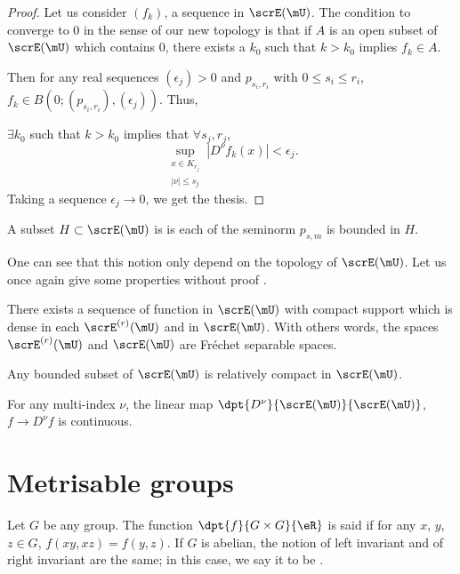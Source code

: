 \begin{proof}
Let us consider $(f_k)$, a sequence in $\scrE(\mU)$. The condition to converge to $0$ in the sense of our new topology is that if $A$ is an open subset of $\scrE(\mU)$ which contains $0$, there exists a $k_0$ such that $k>k_0$ implies $f_k\in A$.

Then for any real sequences $(\epsilon_j)>0$ and $p_{s_i,r_i}$ with $0\leq s_i\leq r_i$, $f_k\in B( 0;(p_{s_i,r_i}),(\epsilon_j) )$. Thus,

$\exists k_0$ such that $k>k_0$ implies that $\forall s_j,r_j$,
\[
   \sup_{ \substack{ x\in K_{r_j}\\|\nu|\leq s_j } }|D^{\nu}f_k(x)|<\epsilon_j.
\]
Taking a sequence $\epsilon_j\to 0$, we get the thesis.
\end{proof}


\begin{definition}
A subset $H\subset\scrE(\mU)$ is  is each of the seminorm $p_{s,m}$ is bounded in $H$.
\label{def:bounded}
\end{definition}
One can see that this notion only depend on the topology of $\scrE(\mU)$. Let us once again give some properties without proof .

\begin{proposition}
There exists a sequence of function in $\scrE(\mU)$ with compact support which is dense in each $\scrE^{(r)}(\mU)$ and in $\scrE(\mU)$. With others words, the spaces $\scrE^{(r)}(\mU)$ and $\scrE(\mU)$ are Fréchet separable spaces. 
\label{prop:E_Frechet}
\end{proposition}

\begin{proposition}
Any bounded subset of $\scrE(\mU)$ is relatively compact in $\scrE(\mU)$.
\end{proposition}

\begin{proposition}
For any multi-index $\nu$, the linear map $\dpt{D^{\nu}}{\scrE(\mU)}{\scrE(\mU)}$, $f\to D^{\nu}f$ is continuous.
\end{proposition}


\section{Metrisable groups}\label{sec:metrisable_groups}

Let $G$ be any group. The function $\dpt{f}{G\times G}{\eR}$ is said  if for any $x$, $y$, $z\in G$, $f(xy,xz)=f(y,z)$. If $G$ is abelian, the notion of left invariant and of right invariant are the same; in this case, we say it to be .

